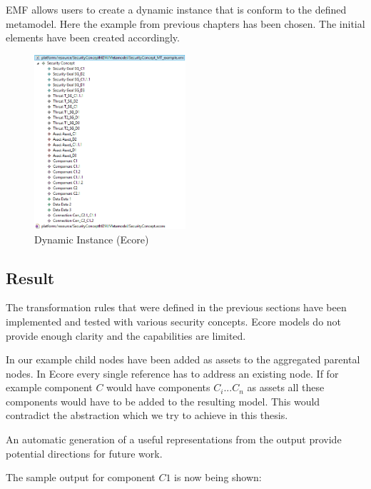 EMF allows users to create a dynamic instance that is conform to the defined metamodel. Here the example from previous chapters has been chosen. The initial elements have been created accordingly.

\begin{figure}[H]
\centering
\includegraphics[width=0.5\textwidth]{pictures/dynamic_instance}
\caption{Dynamic Instance (Ecore)}
\label{fig:ecore_instance}
\end{figure}

\subsection{Result}

The transformation rules that were defined in the previous sections have been implemented and tested with various security concepts. Ecore models do not provide enough clarity and the capabilities are limited. 

In our example child nodes have been added as assets to the aggregated parental nodes. In Ecore every single reference has to address an existing node. If for example component $C$ would have components $C_i ... C_n$ as assets all these components would have to be added to the resulting model. This would contradict the abstraction which we try to achieve in this thesis. 

An automatic generation of a useful representations from the output provide potential directions for future work.

The sample output for component $C1$ is now being shown:

